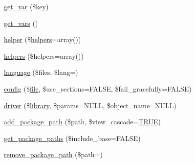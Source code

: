 \begin{DoxyCompactItemize}
\item 
\mbox{\hyperlink{class_c_i___loader_a06567b423ba6d5b852808e581ef00fb0}{get\+\_\+var}} (\$key)
\item 
\mbox{\hyperlink{class_c_i___loader_aff8505856d4aa461fcb3c0207d6a238f}{get\+\_\+vars}} ()
\item 
\mbox{\hyperlink{class_c_i___loader_a2da00ff269596262b62c0c6032b2996f}{helper}} (\$\mbox{\hyperlink{class_c_i___loader_a2c39d50f31ce66ffe936e4f68219e275}{helpers}}=array())
\item 
\mbox{\hyperlink{class_c_i___loader_a2c39d50f31ce66ffe936e4f68219e275}{helpers}} (\$helpers=array())
\item 
\mbox{\hyperlink{class_c_i___loader_ae3e44c33f5f085ad8d6c556ede1385d8}{language}} (\$files, \$lang=\textquotesingle{}\textquotesingle{})
\item 
\mbox{\hyperlink{class_c_i___loader_af54799dcb5bf2f7346b5d2a7d824a471}{config}} (\$\mbox{\hyperlink{class_c_i___loader_a47e4b8eda2bbf9e8bb505cdafb8e4ba5}{file}}, \$use\+\_\+sections=F\+A\+L\+SE, \$fail\+\_\+gracefully=F\+A\+L\+SE)
\item 
\mbox{\hyperlink{class_c_i___loader_ad7ea86a4ca078b6419c7d04827db700b}{driver}} (\$\mbox{\hyperlink{class_c_i___loader_a03207e0bcf58b6c9ecbc09fd2d8eab5d}{library}}, \$params=N\+U\+LL, \$object\+\_\+name=N\+U\+LL)
\item 
\mbox{\hyperlink{class_c_i___loader_a8b23f3be0a84aa31df8b715ca841f5cf}{add\+\_\+package\+\_\+path}} (\$path, \$view\+\_\+cascade=\mbox{\hyperlink{constants_8php_ae04a3efe6aa42044f803ee90c2277846}{T\+R\+UE}})
\item 
\mbox{\hyperlink{class_c_i___loader_a645d5b65ec991d936d864e8af01485e7}{get\+\_\+package\+\_\+paths}} (\$include\+\_\+base=F\+A\+L\+SE)
\item 
\mbox{\hyperlink{class_c_i___loader_a12a6fab391d5b0a90976197c82f6dc07}{remove\+\_\+package\+\_\+path}} (\$path=\textquotesingle{}\textquotesingle{})
\end{DoxyCompactItemize}
